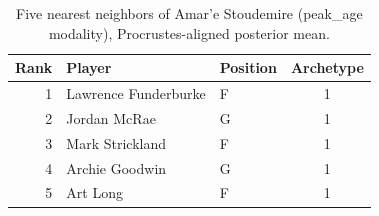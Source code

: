 \begin{table}[htbp]
  \centering\small
  \begin{tabular}{rllc}
    \toprule
    Rank & Player & Position & Archetype \\
    \midrule
    1 & Lawrence Funderburke & F & 1 \\
    2 & Jordan McRae & G & 1 \\
    3 & Mark Strickland & F & 1 \\
    4 & Archie Goodwin & G & 1 \\
    5 & Art Long & F & 1 \\
    \bottomrule
  \end{tabular}
  \caption{Five nearest neighbors of Amar'e Stoudemire (peak_age modality), Procrustes-aligned posterior mean.}
  \label{tab:Amar_e_Stoudemire_neighbors_peak_age}
\end{table}

